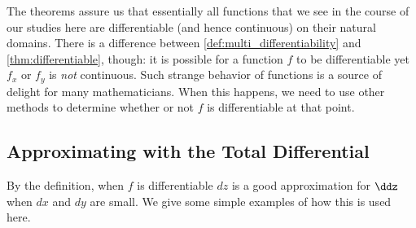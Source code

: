 The theorems assure us that  essentially all functions that we see in the course of our studies here are differentiable (and hence continuous) on their natural domains. There is a difference between \autoref{def:multi_differentiability} and \autoref{thm:differentiable}, though: it is possible for a function $f$ to be differentiable yet $f_x$ or $f_y$ is \textit{not} continuous. Such strange behavior of functions is a source of delight for many mathematicians.  When this happens, we need to use other methods to determine whether or not $f$ is differentiable at that point.

%
%

\subsection*{Approximating with the Total Differential}

By the definition, when $f$ is differentiable $dz$ is a good approximation for $\ddz$ when $dx$ and $dy$ are small. We give some simple examples of how this is used here.

